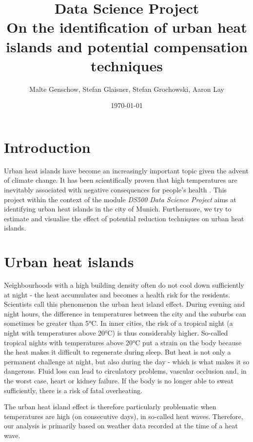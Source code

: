 \documentclass[12pt]{article}
\title{\vspace{-2cm} Data Science Project \\ On the identification of urban heat islands and potential compensation techniques}
\author{Malte Genschow, Stefan Glaisner, Stefan Grochowski, Aaron Lay}
\date{\today}
\begin{document}
\maketitle



\section{Introduction}

Urban heat islands have become an increasingly important topic given the advent of climate change. It has been scientifically proven that high temperatures are inevitably associated with negative consequences for people's health \citep{anderson2009,basu2002,basu2009}. This project within the context of the module \emph{DS500 Data Science Project} aims at identifying urban heat islands in the city of Munich. Furthermore, we try to estimate and visualise the effect of potential reduction techniques on urban heat islands.

\section{Urban heat islands}

Neighbourhoods with a high building density often do not cool down sufficiently at night - the heat accumulates and becomes a health risk for the residents. Scientists call this phenomenon the urban heat island effect. During evening and night hours, the difference in temperatures between the city and the suburbs can sometimes be greater than 5°C. In inner cities, the risk of a tropical night (a night with temperatures above 20°C) is thus considerably higher. So-called tropical nights with temperatures above 20°C put a strain on the body because the heat makes it difficult to regenerate during sleep. But heat is not only a permanent challenge at night, but also during the day - which is what makes it so dangerous. Fluid loss can lead to circulatory problems, vascular occlusion and, in the worst case, heart or kidney failure. If the body is no longer able to sweat sufficiently, there is a risk of fatal overheating.

The urban heat island effect is therefore particularly problematic when temperatures are high (on consecutive days), in so-called heat waves. Therefore, our analysis is primarily based on weather data recorded at the time of a heat wave.
\end{document}

